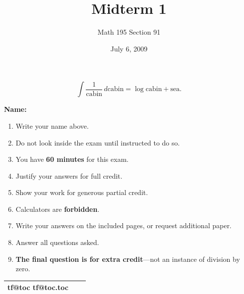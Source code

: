 \documentclass[12pt]{article}
\title{Midterm 1}
\author{Math 195 Section 91}
\date{July 6, 2009}
\makeatletter
\def\inputtoc{%
    \makeatletter
    \@input{\jobname.toc}%
    \if@filesw
      \expandafter\newwrite\csname tf@toc\endcsname
      \immediate\openout \csname tf@toc\endcsname \jobname.toc\relax
    \fi
    \@nobreakfalse
    }
\makeatother
\begin{document}
\setlength{\headheight}{30pt}


\begin{titlepage}
\maketitle

\begin{center}
$$
\int \frac{1}{\mbox{cabin}} \, d\mbox{cabin} = \log \mbox{cabin} + \mbox{sea}.
$$
\end{center}
\vfill
\vfill

\noindent
\hspace{1in}
\textbf{Name: } \hrulefill
\hspace{1in}

\vfill

\begin{multicols}{2}
\begin{enumerate}
\item Write your name above.
\item Do not look inside the exam until instructed to do so.
\item You have \textbf{60 minutes} for this exam.
\item Justify your answers for full credit.
\item Show your work for generous partial credit.
\item Calculators are \textbf{forbidden}.
\item Write your answers on the included pages, or request additional paper.
\item Answer all questions asked.
\item \textbf{The final question is for extra credit}---not an instance of division by zero.
\vfill
\end{enumerate}

\begin{center}
\large
\begin{tabular}{|lrl|}
\hline
\inputtoc
\\ \hline
\end{tabular}
\end{center}

\end{multicols}

\vfill
\vfill
\end{titlepage}
\end{document}
